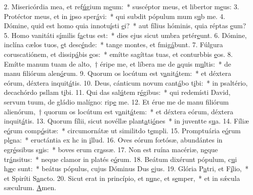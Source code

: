 2. Misericórdia mea, et ref\uline{ú}gium m\uline{e}um:~* suscéptor meus, et libertor m\uline{e}us:
3. Protéctor meus, et in \uline{i}pso sper\uline{á}vi:~* qui subdit pópulum mum s\uline{u}b me.
4. Dómine, quid est homo quia innotu\uline{í}sti \uline{e}i?~* aut fílius hóminis, quia réptas \uline{e}um?
5. Homo vanitáti s\uline{í}milis f\uline{a}ctus est:~* dies ejus sicut umbra prtér\uline{e}unt.
6. Dómine, inclína cælos tuos, \uline{e}t desc\uline{é}nde:~* tange montes, et fmig\uline{á}bunt.
7. Fúlgura coruscatiónem, et dissip\uline{á}bis \uline{e}os:~* emítte sagíttas tuas, et conturbbis \uline{e}os.
8. Emítte manum tuam de alto,~† éripe me, et líbera me de \uline{a}quis m\uline{u}ltis:~* de manu filiórum alen\uline{ó}rum.
9. Quorum os locútum est v\uline{a}nit\uline{á}tem:~* et déxtera eórum, déxtera inquit\uline{á}tis.
10. Deus, cánticum novum cant\uline{á}bo t\uline{i}bi:~* in psaltério, decachórdo psllam t\uline{i}bi.
11. Qui das sal\uline{ú}tem r\uline{é}gibus:~* qui redemísti David, servum tuum, de gládio malígno: rip\uline{e} me.
12. Et érue me de manu filiórum alienórum,~† quorum os locútum est v\uline{a}nit\uline{á}tem:~* et déxtera eórum, déxtera inquit\uline{á}tis.
13. Quorum fílii, sicut novéllæ plant\uline{a}ti\uline{ó}nes~* in juventte s\uline{u}a.
14. Fíliæ e\uline{ó}rum comp\uline{ó}sitæ:~* circumornátæ ut similitdo t\uline{e}mpli.
15. Promptuária e\uline{ó}rum pl\uline{e}na:~* eructántia ex hc in \uline{i}llud.
16. Oves eórum fœtósæ, abundántes in egr\uline{é}ssibus s\uline{u}is:~* boves erum cr\uline{a}ssæ.
17. Non est ruína macériæ, n\uline{e}que tr\uline{á}nsitus:~* neque clamor in platés e\uline{ó}rum.
18. Beátum dixérunt pópulum, c\uline{u}i h\uline{æ}c sunt:~* beátus pópulus, cujus Dóminus Dus \uline{e}jus.
19. Glória P\uline{a}tri, et F\uline{í}lio,~* et Spiríti S\uline{a}ncto.
20. Sicut erat in princípio, et n\uline{u}nc, et s\uline{e}mper,~* et in sǽcula sæculrum. \uline{A}men.
